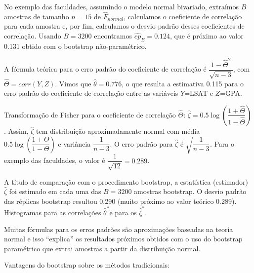 \documentclass[
  letterpaper,
  DIV=11,
  numbers=noendperiod]{scrreprt}
\begin{document}
No exemplo das faculdades, assumindo o modelo normal bivariado,
extraímos \(B\) amostras de tamanho \(n=15\) de \(\hat{F}_{normal}\),
calculamos o coeficiente de correlação para cada amostra e, por fim,
calculamos o desvio padrão desses coeficientes de correlação. Usando
\(B=3200\) encontramos \(\hat{ep}_{B}=0.124\), que é próximo ao valor
0.131 obtido com o bootstrap não-paramétrico.

A fórmula teórica para o erro padrão do coeficiente de correlação é
\(\dfrac{1-\hat{\Theta}^2}{\sqrt{n-3}}\), com
\(\hat{\Theta}=corr(Y,Z)\). Vimos que \(\hat{\theta}=0.776\), o que
resulta a estimativa 0.115 para o erro padrão do coeficiente de
correlação entre as variáveis \(Y\)=LSAT e \(Z\)=GPA.

Transformação de Fisher para o coeficiente de correlação
\(\hat{\Theta}\):
\(\hat{\zeta}=0.5\log\left(\dfrac{1+\hat{\Theta}}{1-\hat{\Theta}}\right)\).
Assim, \(\hat{\zeta}\) tem distribuição aproximadamente normal com média
\(0.5\log\left(\dfrac{1+\Theta}{1-\Theta}\right)\) e variância
\(\dfrac{1}{n-3}\). O erro padrão para \(\hat{\zeta}\) é
\(\sqrt{\dfrac{1}{n-3}}\). Para o exemplo das faculdades, o valor é
\(\dfrac{1}{\sqrt{12}}=0.289\).

A título de comparação com o procedimento bootstrap, a estatística
(estimador) \(\hat{\zeta}\) foi estimado em cada uma das \(B=3200\)
amostras bootstrap. O desvio padrão das réplicas bootstrap resultou
0.290 (muito próximo ao valor teórico 0.289). Histogramas para as
correlações \(\hat{\theta}^*\)e para os \(\hat{\zeta}^*\).

\begin{tcolorbox}[enhanced jigsaw, coltitle=black, bottomtitle=1mm, toprule=.15mm, arc=.35mm, colframe=quarto-callout-important-color-frame, breakable, opacityback=0, bottomrule=.15mm, rightrule=.15mm, titlerule=0mm, toptitle=1mm, title=\textcolor{quarto-callout-important-color}{\faExclamation}\hspace{0.5em}{Importante}, leftrule=.75mm, opacitybacktitle=0.6, left=2mm, colback=white, colbacktitle=quarto-callout-important-color!10!white]

Muitas fórmulas para os erros padrões são aproximações baseadas na
teoria normal e isso ``explica'' os resultados próximos obtidos com o
uso do bootstrap paramétrico que extrai amostras a partir da
distribuição normal.

\end{tcolorbox}

Vantagens do bootstrap sobre os métodos tradicionais:
\end{document}

